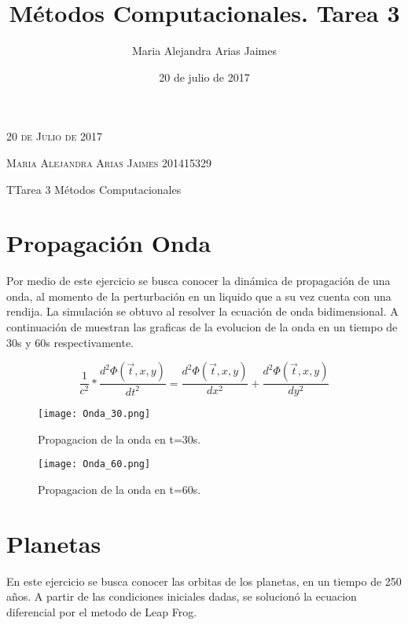 \documentclass{article}
\author{Maria Alejandra Arias Jaimes}
\date{20 de julio de 2017}
\title{Métodos Computacionales. Tarea 3}
\newcommand{\JournalIssue}[1]{%
                \hfill \textsc{20 de Julio de 2017}
                \par \normalsize \normalfont}
\newcommand{\JournalName}[1]{%
                \begin{center}
                        \Huge \usefont{T1}{m}{n}
                        #1%
                \end{center}
                \par \normalsize \normalfont}
\newcommand{\NewsAuthor}[1]{%
                        \hfill \textsc{Maria Alejandra Arias Jaimes 201415329}
                        \par \normalsize \normalfont}
\begin{document}
\JournalIssue{1}
\NewsAuthor{}
\JournalName{ TTarea 3 Métodos Computacionales}

\section{Propagación Onda}
Por medio de este ejercicio se busca conocer la dinámica de propagación de una onda, al momento de la perturbación en un liquido que a su vez cuenta con una rendija.
La simulación se obtuvo al resolver la ecuación de onda bidimensional.
A continuación de muestran las graficas de la evolucion de la onda en un tiempo de 30s y 60s respectivamente. 

\begin{equation}
\frac{1}{c^2}*\frac{d^2\Phi(\vec t, x, y)}{dt^2} = \frac{d^2\Phi(\vec t, x, y)}{dx^2}+ \frac{d^2\Phi(\vec t, x, y)}{dy^2}
\end{equation}

\begin{figure}[h!]
\centering
\texttt{[image: Onda\_30.png]}
\caption{Propagacion de la onda en t=30s.}
\texttt{[image: Onda\_60.png]}
\caption{Propagacion de la onda en t=60s.}
\end{figure}

 
\section{Planetas}

En este ejercicio se busca conocer las orbitas de los planetas, en un tiempo de 250 años.
A partir de las condiciones iniciales dadas, se solucionó la ecuacion diferencial por el metodo de Leap Frog. 
\end{document}
